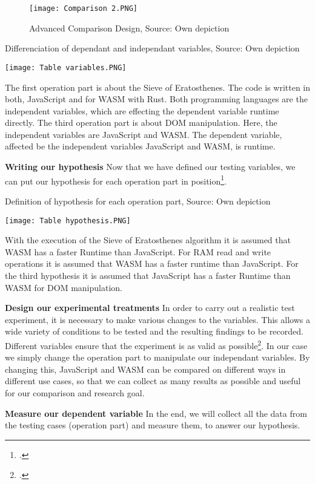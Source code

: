 \begin{figure}[H]
    \centering
    \caption{Advanced Comparison Design, Source: Own depiction}
	\label{fig:comparison}
    \texttt{[image: Comparison 2.PNG]}
\end{figure}

\begin{table}[H]
    \centering
    \caption{Differenciation of dependant and independant variables, Source: Own depiction}
	\label{fig:variables}
    \texttt{[image: Table variables.PNG]}
\end{table}

The first operation part is about the Sieve of Eratosthenes. The code is written in both, JavaScript and for WASM with Rust. Both programming languages are the independent variables, which are effecting the dependent variable runtime directly.
The third operation part is about DOM manipulation. Here, the independent variables are JavaScript and WASM. The dependent variable, affected be the independent variables JavaScript and WASM, is runtime.

\textbf{Writing our hypothesis} \newline
Now that we have defined our testing variables, we can put our hypothesis for each operation part in position\footcite{bevans_guide_2019}.

\begin{table}[H]
    \centering
    \caption{Definition of hypothesis for each operation part, Source: Own depiction}
	\label{fig:hypothesis}
    \texttt{[image: Table hypothesis.PNG]}
\end{table}

With the execution of the Sieve of Eratosthenes algorithm it is assumed that WASM has a faster Runtime than JavaScript.
For RAM read and write operations it is assumed that WASM has a faster runtime than JavaScript.
For the third hypothesis it is assumed that JavaScript has a faster Runtime than WASM for DOM manipulation.

\textbf{Design our experimental treatments} \newline
In order to carry out a realistic test experiment, it is necessary to make various changes to the variables. This allows a wide variety of conditions to be tested and the resulting findings to be recorded. Different variables ensure that the experiment is as valid as possible\footcite{bevans_guide_2019}.
In our case we simply change the operation part to manipulate our independant variables. By changing this, JavaScript and WASM can be compared on different ways in different use cases, so that we can collect as many results as possible and useful for our comparison and research goal.

\textbf{Measure our dependent variable} \newline
In the end, we will collect all the data from the testing cases (operation part) and measure them, to answer our hypothesis.
